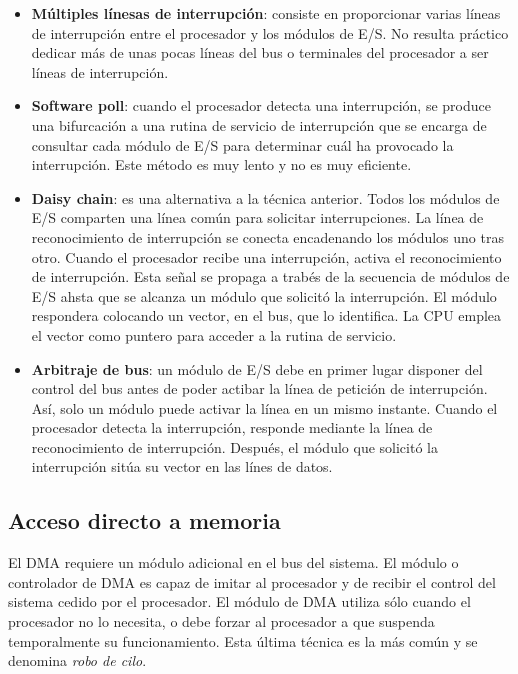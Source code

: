 \begin{subs}
  \begin{itemize}
    \item \textbf{Múltiples línesas de interrupción}: consiste en proporcionar varias líneas de interrupción entre el procesador y los módulos de E/S. No resulta práctico dedicar más de unas pocas líneas del bus o terminales del procesador a ser líneas de interrupción. 
    \item \textbf{Software poll}: cuando el procesador detecta una interrupción, se produce una bifurcación a una rutina de servicio de interrupción que se encarga de consultar cada módulo de E/S para determinar cuál ha provocado la interrupción. Este método es muy lento y no es muy eficiente.
    \item \textbf{Daisy chain}: es una alternativa a la técnica anterior. Todos los módulos de E/S comparten una línea común para solicitar interrupciones. La línea de reconocimiento de interrupción se conecta encadenando los módulos uno tras otro. Cuando el procesador recibe una interrupción, activa el reconocimiento de interrupción. Esta señal se propaga a trabés de la secuencia de módulos de E/S ahsta que se alcanza un módulo que solicitó la interrupción. El módulo respondera colocando un vector, en el bus, que lo identifica. La CPU emplea el vector como puntero para acceder a la rutina de servicio.
    \item \textbf{Arbitraje de bus}: un módulo de E/S debe en primer lugar disponer del control del bus antes de poder actibar la línea de petición de interrupción. Así, solo un módulo puede activar la línea en un mismo instante. Cuando el procesador detecta la interrupción, responde mediante la línea de reconocimiento de interrupción. Después, el módulo que solicitó la interrupción sitúa su vector en las línes de datos.
  \end{itemize}
\end{subs}

\subsection{Acceso directo a memoria}

El DMA requiere un módulo adicional en el bus del sistema. El módulo o controlador de DMA es capaz de imitar al procesador y de recibir el control del sistema cedido por el procesador. El módulo de DMA utiliza sólo cuando el procesador no lo necesita, o debe forzar al procesador a que suspenda temporalmente su funcionamiento. Esta última técnica es la más común y se denomina \textit{robo de cilo}.

